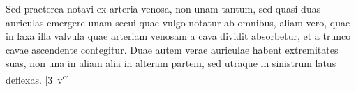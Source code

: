 \pend 
\newpage
\pstart  Sed praeterea notavi ex arteria venosa, non unam tantum, sed quasi duas auriculas emergere unam secui quae vulgo notatur ab omnibus, aliam vero, quae in laxa illa valvula quae arteriam venosam a cava dividit absorbetur, et a trunco cavae ascendente contegitur. 
\pend
\pstart\noindent Duae autem verae auriculae habent extremitates suas, non una in aliam alia in alteram partem, sed utraque in sinistrum latus deflexas.
[3~v\textsuperscript{o}]
\pend